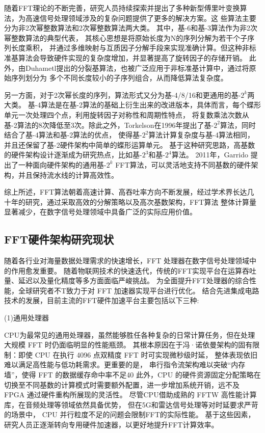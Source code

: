 随着FFT理论的不断完善，研究人员持续探索并提出了多种新型傅里叶变换算法，为高速信号处理领域涉及的复杂问题提供了更多的解决方案。这
些算法主要分为非2次幂整数算法和2次幂整数算法两大类。
其中，基-6\cite{prakash1981new}和基-3\cite{dubois1978new}算法作为非2次幂整数算法的典型代表，
其核心思想是将原始长度为N的序列分解为若干个子序列长度乘积，
并通过多维映射与互质因子分解手段来实现准确计算。但这种非标准基算法会导致硬件实现的复杂度增加，并显著提高了旋转因子的存储开销。
此外，由Duhametl提出的分裂基算法\cite{duhamel1984split}，也被广泛应用于非标准基计算中，通过将原始序列划分为
多个不同长度较小的子序列组合，从而降低算法复杂度。

另一方面，对于2次幂长度的序列，算法形式又分为基-4/8/16和更通用的基-$2^k$两大类。
基-4算法是在基-2算法的基础上衍生出来的改进版本，具体而言，每个蝶形单元一次处理四个点，利用旋转因子对称性和周期性特点，
将复数乘法次数从基-2算法的8次降低至3次。除此之外，Torkelson在1996年提出了基-$2^2$算法，同时结合了基-4算法和基-2算法的优点，
使得基-$2^2$算法计算复杂度与基-4算法相同，并且还保留了基-2硬件架构中简单的蝶形运算单元。
基于这种研究思路，高基数的硬件架构设计逐渐成为研究热点，比如基-$2^3$\cite{adiono200964}和基-$2^4$\cite{fan2006low}算法。
2011年，Garrido\cite{garrido2011pipelined}
提出了一种面向硬件架构的通用基-$2^k$ FFT算法，可以灵活地支持不同基数的硬件架构，并且保持流水线的计算高效性。

综上所述，FFT算法朝着高速计算、高吞吐率方向不断发展，经过学术界长达几十年的研究，通过采取高效的分解策略以及高次基数架构，FFT算法
整体计算量显著减少，在数字信号处理领域中具备广泛的实际应用价值。

\subsection[\hspace{-2pt}FFT加速器硬件研究现状]{{ \hspace{-8pt}}FFT硬件架构研究现状}\label{section 1-2-1}

随着各行业对海量数据处理需求的快速增长，FFT 处理器在数字信号处理领域中的作用愈发重要。
随着物联网技术的快速迭代，传统的FFT实现平台在运算吞吐量、延迟以及量化精度等多方面面临严峻挑战。
为全面提升FFT处理器的综合性能，全球研究者不T致力于对 FFT 加速器实现平台进行优化。
结合先进集成电路技术的发展，目前主流的FFT硬件加速平台主要包括以下三种:

(1)通用处理器

CPU为最常见的通用处理器，虽然能够胜任各种复杂的日常计算任务，但在处理大规模 FFT 时仍面临明显的性能瓶颈。
其根本原因在于冯·诺依曼架构的固有限制：即使 CPU 在执行 4096 点双精度 FFT 时可实现微秒级时延，
整体表现依旧难以满足高性能与低功耗需求。更重要的是，
串行指令流架构难以突破“内存墙”，使得 FFT 的数据缓存命中率不足40%
此外，CPU 的硬件资源固定分配策略在切换至不同基数的计算模式时需要额外配置，进一步增加系统开销，远不及 FPGA 通过硬件重构所展现的灵活性。
尽管CPU借助成熟的 FFTW 高性能计算库，在音频处理等领域依然具备优势，
但在5G和雷达信号处理等对时延要求严苛的场景中，
CPU 并行粒度不足的问题会限制FFT的实际性能。
基于这些因素，研究人员正逐渐转向专用硬件加速器，以更好地提升FFT计算效率。


